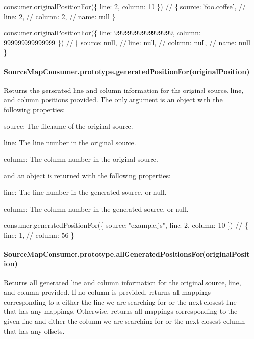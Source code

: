\begin{DoxyCode}
consumer.originalPositionFor(\{ line: 2, column: 10 \})
// \{ source: 'foo.coffee',
//   line: 2,
//   column: 2,
//   name: null \}

consumer.originalPositionFor(\{ line: 99999999999999999, column: 999999999999999 \})
// \{ source: null,
//   line: null,
//   column: null,
//   name: null \}
\end{DoxyCode}


\paragraph*{Source\+Map\+Consumer.\+prototype.\+generated\+Position\+For(original\+Position)}

Returns the generated line and column information for the original source, line, and column positions provided. The only argument is an object with the following properties\+:


\begin{DoxyItemize}
\item {\ttfamily source}\+: The filename of the original source.
\item {\ttfamily line}\+: The line number in the original source.
\item {\ttfamily column}\+: The column number in the original source.
\end{DoxyItemize}

and an object is returned with the following properties\+:


\begin{DoxyItemize}
\item {\ttfamily line}\+: The line number in the generated source, or null.
\item {\ttfamily column}\+: The column number in the generated source, or null.
\end{DoxyItemize}


\begin{DoxyCode}
consumer.generatedPositionFor(\{ source: "example.js", line: 2, column: 10 \})
// \{ line: 1,
//   column: 56 \}
\end{DoxyCode}


\paragraph*{Source\+Map\+Consumer.\+prototype.\+all\+Generated\+Positions\+For(original\+Position)}

Returns all generated line and column information for the original source, line, and column provided. If no column is provided, returns all mappings corresponding to a either the line we are searching for or the next closest line that has any mappings. Otherwise, returns all mappings corresponding to the given line and either the column we are searching for or the next closest column that has any offsets.

